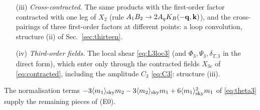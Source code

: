 \begin{enumerate}
(and in $3L_1L_2$), keeping the first-order factor as a Fourier mode $\vk$.  Individual tadpoles shift under the residual time reparametrisation of
Sec.~\ref{sec:asm-zeromodes}; only their sum with the clock, emission-surface and normalisation terms is invariant.
\item[(iii)] \emph{Cross-contracted.}  The same products with the first-order factor contracted with one leg of $X_2$ (rule
$A_1B_2\to2A_qK_B(-\mathbf q,\mathbf k)$), and the cross-pairings of three first-order factors at different points: a loop convolution, structure (ii)
of Sec.~\ref{sec:thirteen}.
\item[(iv)] \emph{Third-order fields.}  The local shear \eqref{eq:L3loc3} (and $\Phi_3,\Psi_3,\delta_{T,3}$ in the direct form), which enter only
through the contracted fields $X_{3c}$ of \eqref{eq:contracted}, including the amplitude $C_3$ \eqref{eq:C3}: structure (iii).
\end{enumerate}
The normalisation terms $-3\langle m_1\rangle_{\rm sky}m_2-3\langle m_2\rangle_{\rm sky}m_1+6\langle m_1\rangle_{\rm sky}^2m_1$ of \eqref{eq:theta3} supply the remaining pieces of (E0).

